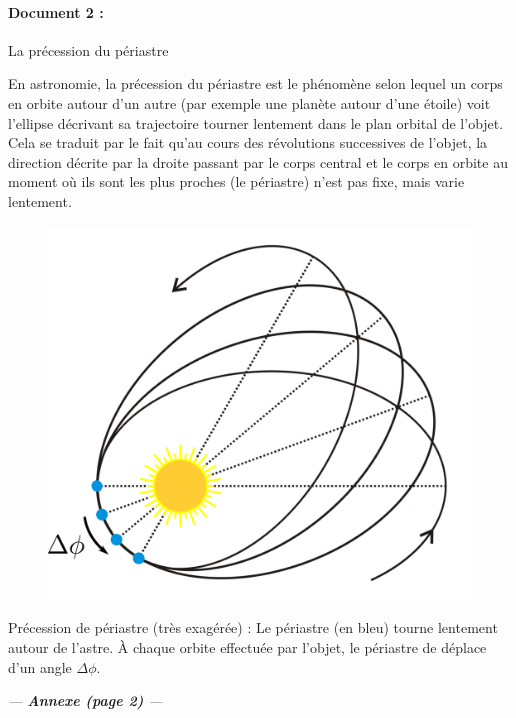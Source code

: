 \paragraph{Document 2 :}\textsf{La précession du périastre}
\begin{center}\begin{minipage}{.9\textwidth}
En astronomie, la précession du périastre est le phénomène selon lequel un corps en orbite autour d'un autre (par exemple une planète autour d'une étoile) voit l'ellipse décrivant sa trajectoire tourner lentement dans le plan orbital de l'objet. Cela se traduit par le fait qu'au cours des révolutions successives de l'objet, la direction décrite par la droite passant par le corps central et le corps en orbite au moment où ils sont les plus proches (le périastre) n'est pas fixe, mais varie lentement.
\end{minipage}\end{center}
\begin{figure}[H]
    \centering
    \includegraphics[width=0.3\linewidth]{oraux/centrale/perihelion_precession_dphi.png}
\end{figure}
\begin{center}\begin{minipage}{.9\textwidth}
Précession de périastre (très exagérée) : Le périastre (en bleu) tourne lentement autour de l'astre. À chaque orbite effectuée par l'objet, le périastre de déplace d'un angle $\Delta \phi$.  
\end{minipage}\end{center}
\pagebreak

\printexerciseheader

\begin{center}
    \itshape --- \quad \textbf{Annexe (page 2)} \quad ---
\end{center}

